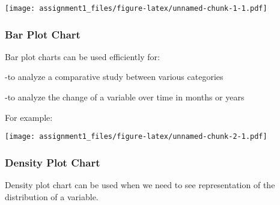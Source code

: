 \documentclass[
]{article}
\newenvironment{Shaded}{\begin{snugshade}}{\end{snugshade}}
\newcommand{\AttributeTok}[1]{\textcolor[rgb]{0.77,0.63,0.00}{#1}}
\newcommand{\ConstantTok}[1]{\textcolor[rgb]{0.00,0.00,0.00}{#1}}
\newcommand{\DecValTok}[1]{\textcolor[rgb]{0.00,0.00,0.81}{#1}}
\newcommand{\DocumentationTok}[1]{\textcolor[rgb]{0.56,0.35,0.01}{\textbf{\textit{#1}}}}
\newcommand{\FloatTok}[1]{\textcolor[rgb]{0.00,0.00,0.81}{#1}}
\newcommand{\FunctionTok}[1]{\textcolor[rgb]{0.00,0.00,0.00}{#1}}
\newcommand{\NormalTok}[1]{#1}
\newcommand{\SpecialCharTok}[1]{\textcolor[rgb]{0.00,0.00,0.00}{#1}}
\newcommand{\StringTok}[1]{\textcolor[rgb]{0.31,0.60,0.02}{#1}}
\begin{document}
\begin{Shaded}
\end{Shaded}

\texttt{[image: assignment1\_files/figure-latex/unnamed-chunk-1-1.pdf]}

\hypertarget{bar-plot-chart}{%
\subsubsection{Bar Plot Chart}\label{bar-plot-chart}}

Bar plot charts can be used efficiently for:

-to analyze a comparative study between various categories

-to analyze the change of a variable over time in months or years

For example:

\begin{Shaded}
\end{Shaded}

\texttt{[image: assignment1\_files/figure-latex/unnamed-chunk-2-1.pdf]}

\hypertarget{density-plot-chart}{%
\subsubsection{Density Plot Chart}\label{density-plot-chart}}

Density plot chart can be used when we need to see representation of the
distribution of a variable.
\end{document}
